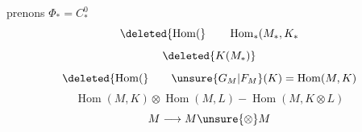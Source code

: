 prenons $\Phi_*=C_*^0$
\[
\deleted{\operatorname{Hom}(}\qquad
\operatorname{Hom}_*(M_*,K_*
\]
\[
\deleted{K(M_*)}
\]
\[
\deleted{\operatorname{Hom}(}\qquad
\unsure{G_M|F_M}(K)=\operatorname{Hom}(M,K)
\]
\[
\operatorname{Hom}(M,K)\otimes\operatorname{Hom}(M,L)
-\operatorname{Hom}(M,K\otimes L)
\]
\[
M\longrightarrow M\unsure{\otimes}M
\]
